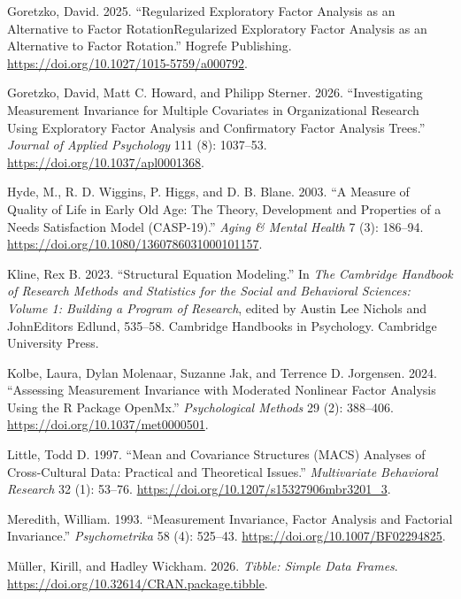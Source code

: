 \documentclass[
  man,
  floatsintext]{apa7}
\newlength{\cslhangindent}
\newenvironment{CSLReferences}[2] %
 {\begin{list}{}{%
  \setlength{\itemindent}{0pt}
  \setlength{\leftmargin}{0pt}
  \setlength{\parsep}{0pt}
  \ifodd #1
   \setlength{\leftmargin}{\cslhangindent}
   \setlength{\itemindent}{-1\cslhangindent}
  \fi
  \setlength{\itemsep}{#2\baselineskip}}}
 {\end{list}}
\begin{document}
\begin{CSLReferences}{1}{0}
Goretzko, David. 2025. {``Regularized Exploratory Factor Analysis as an
Alternative to Factor RotationRegularized Exploratory Factor Analysis as
an Alternative to Factor Rotation.''} Hogrefe Publishing.
\url{https://doi.org/10.1027/1015-5759/a000792}.

Goretzko, David, Matt C. Howard, and Philipp Sterner. 2026.
{``Investigating Measurement Invariance for Multiple Covariates in
Organizational Research Using Exploratory Factor Analysis and
Confirmatory Factor Analysis Trees.''} \emph{Journal of Applied
Psychology} 111 (8): 1037--53. \url{https://doi.org/10.1037/apl0001368}.

Hyde, M., R. D. Wiggins, P. Higgs, and D. B. Blane. 2003. {``A Measure
of Quality of Life in Early Old Age: The Theory, Development and
Properties of a Needs Satisfaction Model (CASP-19).''} \emph{Aging \&
Mental Health} 7 (3): 186--94.
\url{https://doi.org/10.1080/1360786031000101157}.

Kline, Rex B. 2023. {``Structural Equation Modeling.''} In \emph{The
Cambridge Handbook of Research Methods and Statistics for the Social and
Behavioral Sciences: Volume 1: Building a Program of Research}, edited
by Austin Lee Nichols and JohnEditors Edlund, 535--58. Cambridge
Handbooks in Psychology. Cambridge University Press.

Kolbe, Laura, Dylan Molenaar, Suzanne Jak, and Terrence D. Jorgensen.
2024. {``{Assessing Measurement Invariance with Moderated Nonlinear
Factor Analysis Using the R Package OpenMx}.''} \emph{Psychological
Methods} 29 (2): 388--406. \url{https://doi.org/10.1037/met0000501}.

Little, Todd D. 1997. {``Mean and {Covariance Structures} ({MACS})
{Analyses} of {Cross-Cultural Data}: {Practical} and {Theoretical
Issues}.''} \emph{Multivariate Behavioral Research} 32 (1): 53--76.
\url{https://doi.org/10.1207/s15327906mbr3201_3}.

Meredith, William. 1993. {``Measurement {Invariance}, {Factor Analysis}
and {Factorial Invariance}.''} \emph{Psychometrika} 58 (4): 525--43.
\url{https://doi.org/10.1007/BF02294825}.

Müller, Kirill, and Hadley Wickham. 2026. \emph{Tibble: Simple Data
Frames}. \url{https://doi.org/10.32614/CRAN.package.tibble}.


\end{CSLReferences}
\end{document}
